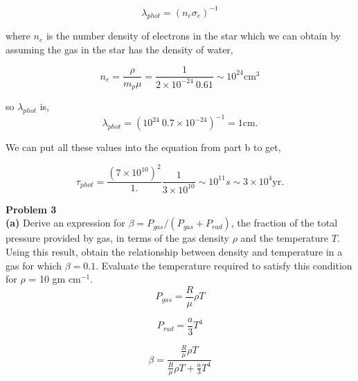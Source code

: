 \documentclass[12pt]{article}
\begin{document}
\begin{equation}
\lambda_{phot} = \left ( n_e\sigma_e \right )^{-1}
\end{equation}

\noindent where $n_e$ is the number density of electrons in the star which we can obtain by assuming the gas in the star has the density of water,


\begin{equation}
n_e = \frac{\rho}{m_p \mu} = \frac{1}{2\times 10^{-24} ~0.61} \sim 10^{24} \mathrm{cm}^3
\end{equation}


\noindent so $\lambda_{phot}$ is,
\begin{equation}
\lambda_{phot} = \left ( 10^{24} ~ 0.7 \times10^{-24} \right )^{-1} =  1 \mathrm{cm}.
\end{equation}

\noindent We can put all these values into the equation from part b to get,


\begin{equation}
\tau_{phot} = \frac{\left( 7 \times 10^{10} \right)^2}{1.} \frac{1}{3 \times 10^{10}} \sim 10^{11} s \sim 3\times10^4 \mathrm{yr} .
\end{equation}


\noindent \textbf{Problem 3}\\

\noindent \textbf{(a)} Derive an expression for $\beta = P_{gas}/\left ( P_{gas} + P_{rad}\right)$, the fraction of the total pressure provided by gas, in terms of the gas density $\rho$ and the temperature $T$. Using this result, obtain the relationship between density and temperature in a gas for which $\beta = 0.1$. Evaluate the temperature required to satisfy this condition for $\rho$ = 10 gm cm$^{-1}$. \\

\begin{equation}
P_{gas} = \frac{R}{\mu}\rho T
\end{equation}

\begin{equation}
P_{rad} = \frac{a}{3}T^4
\end{equation}

\begin{equation}
\beta =  \frac{\frac{R}{\mu}\rho T}{  \frac{R}{\mu}\rho T +   \frac{a}{3}T^4 }
\end{equation}
\end{document}
